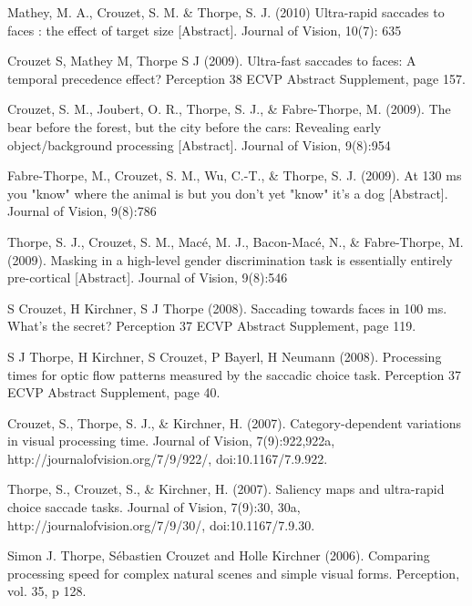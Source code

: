 \documentclass[margin,line]{resume}
\begin{document}
\begin{resume}
	\vspace{-2mm} Mathey, M. A., Crouzet, S. M. \& Thorpe, S. J. (2010) Ultra-rapid saccades to faces : the effect of target size [Abstract]. Journal of Vision, 10(7): 635

	\vspace{-2mm} Crouzet S, Mathey M, Thorpe S J (2009). Ultra-fast saccades to faces: A temporal precedence effect? Perception 38 ECVP Abstract Supplement, page 157.

	\vspace{-2mm} Crouzet, S. M., Joubert, O. R., Thorpe, S. J., \& Fabre-Thorpe, M. (2009). The bear before the forest, but the city before the cars: Revealing early object/background processing [Abstract]. Journal of Vision, 9(8):954

	\vspace{-2mm} Fabre-Thorpe, M., Crouzet, S. M., Wu, C.-T., \& Thorpe, S. J. (2009). At 130 ms you "know" where the animal is but you don't yet "know" it's a dog [Abstract]. Journal of Vision, 9(8):786

	\vspace{-2mm} Thorpe, S. J., Crouzet, S. M., Macé, M. J., Bacon-Macé, N., \& Fabre-Thorpe, M. (2009). Masking in a high-level gender discrimination task is essentially entirely pre-cortical [Abstract]. Journal of Vision, 9(8):546

	\vspace{-2mm} S Crouzet, H Kirchner, S J Thorpe (2008). Saccading towards faces in 100 ms. What's the secret? Perception 37 ECVP Abstract Supplement, page 119. 
	
	\vspace{-2mm} S J Thorpe, H Kirchner, S Crouzet, P Bayerl, H Neumann (2008). Processing times for optic flow patterns measured by the saccadic choice task. Perception 37 ECVP Abstract Supplement, page 40.

	\vspace{-2mm} Crouzet, S., Thorpe, S. J., \& Kirchner, H. (2007). Category-dependent variations in visual processing time. Journal of Vision, 7(9):922,922a, http://journalofvision.org/7/9/922/, doi:10.1167/7.9.922.

	\vspace{-2mm} Thorpe, S., Crouzet, S., \& Kirchner, H. (2007). Saliency maps and ultra-rapid choice saccade tasks. Journal of Vision, 7(9):30, 30a, http://journalofvision.org/7/9/30/, doi:10.1167/7.9.30.

	\vspace{-2mm} Simon J. Thorpe, Sébastien Crouzet and Holle Kirchner (2006). Comparing processing speed for complex natural scenes and simple visual forms. Perception, vol. 35, p 128.


\end{resume}
\end{document}
